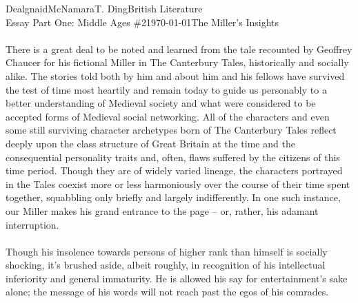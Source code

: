 \documentclass[12pt,letterpaper]{article}
\begin{document}
\begin{mla}{Dealgnaid}{McNamara}{T. Ding}{British Literature \\ Essay Part One: Middle Ages \#2}{\today}{The Miller's Insights}

\paragraph{}
There is a great deal to be noted and learned from the tale recounted by Geoffrey Chaucer for his fictional Miller in The Canterbury Tales, historically and socially alike. The stories told both by him and about him and his fellows have survived the test of time most heartily and remain today to guide us personably to a better understanding of Medieval society and what were considered to be accepted forms of Medieval social networking. All of the characters and even some still surviving character archetypes born of The Canterbury Tales reflect deeply upon the class structure of Great Britain at the time and the consequential personality traits and, often, flaws suffered by the citizens of this time period. Though they are of widely varied lineage, the characters portrayed in the Tales coexist more or less harmoniously over the course of their time spent together, squabbling only briefly and largely indifferently. In one such instance, our Miller makes his grand entrance to the page – or, rather, his adamant interruption.
\paragraph{}
	Though his insolence towards persons of higher rank than himself is socially shocking, it's brushed aside, albeit roughly, in recognition of his intellectual inferiority and general immaturity. He is allowed his say for entertainment's sake alone; the message of his words will not reach past the egos of his comrades.

\end{mla}
\end{document}
